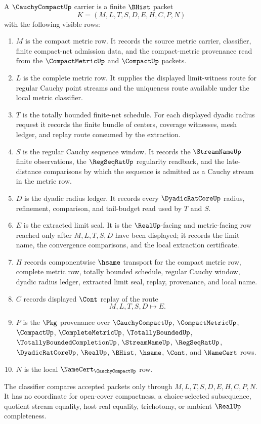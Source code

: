 \begin{definition}
\label{def:cauchy-compact-carrier}
A $\CauchyCompactUp$ carrier is a finite $\BHist$ packet
$$
K=(M,L,T,S,D,E,H,C,P,N)
$$
with the following visible rows:
\begin{enumerate}
\item $M$ is the compact metric row. It records the source metric carrier, classifier, finite compact-net admission data, and the compact-metric provenance read from the $\CompactMetricUp$ and $\CompactUp$ packets.
\item $L$ is the complete metric row. It supplies the displayed limit-witness route for regular Cauchy point streams and the uniqueness route available under the local metric classifier.
\item $T$ is the totally bounded finite-net schedule. For each displayed dyadic radius request it records the finite bundle of centers, coverage witnesses, mesh ledger, and replay route consumed by the extraction.
\item $S$ is the regular Cauchy sequence window. It records the $\StreamNameUp$ finite observations, the $\RegSeqRatUp$ regularity readback, and the late-distance comparisons by which the sequence is admitted as a Cauchy stream in the metric row.
\item $D$ is the dyadic radius ledger. It records every $\DyadicRatCoreUp$ radius, refinement, comparison, and tail-budget read used by $T$ and $S$.
\item $E$ is the extracted limit seal. It is the $\RealUp$-facing and metric-facing row reached only after $M,L,T,S,D$ have been displayed; it records the limit name, the convergence comparisons, and the local extraction certificate.
\item $H$ records componentwise $\hsame$ transport for the compact metric row, complete metric row, totally bounded schedule, regular Cauchy window, dyadic radius ledger, extracted limit seal, replay, provenance, and local name.
\item $C$ records displayed $\Cont$ replay of the route
$$
M,L,T,S,D \longmapsto E .
$$
\item $P$ is the $\Pkg$ provenance over $\CauchyCompactUp$, $\CompactMetricUp$, $\CompactUp$, $\CompleteMetricUp$, $\TotallyBoundedUp$, $\TotallyBoundedCompletionUp$, $\StreamNameUp$, $\RegSeqRatUp$, $\DyadicRatCoreUp$, $\RealUp$, $\BHist$, $\hsame$, $\Cont$, and $\NameCert$ rows.
\item $N$ is the local $\NameCert_{\CauchyCompactUp}$ row.
\end{enumerate}
The classifier compares accepted packets only through $M,L,T,S,D,E,H,C,P,N$. It has no coordinate for open-cover compactness, a choice-selected subsequence, quotient stream equality, host real equality, trichotomy, or ambient $\RealUp$ completeness.
\end{definition}

